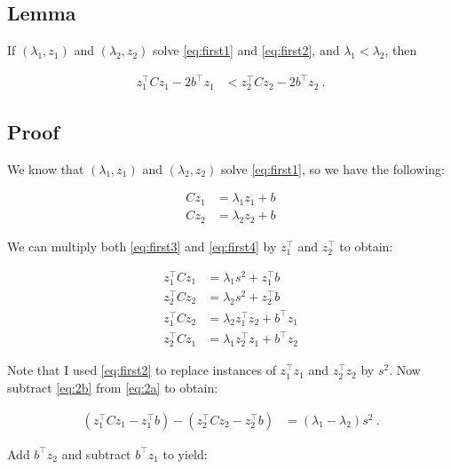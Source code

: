 \documentclass[10pt,letterpaper]{article}
\begin{document}
\subsection*{Lemma}

If $(\lambda_1,z_1)$ and $(\lambda_2,z_2)$ solve \eqref{eq:first1} and \eqref{eq:first2}, and $\lambda_1 < \lambda_2$, then


\begin{align*}
z_1^\top C z_1 - 2b^\top z_1 &< z_2^\top C z_2 - 2b^\top z_2~.
\end{align*}


\subsection*{Proof}
We know that $(\lambda_1,z_1)$ and $(\lambda_2,z_2)$ solve \eqref{eq:first1}, so we have the following:

\begin{subequations}
\begin{align}
\label{eq:first3} Cz_1 &= \lambda_1 z_1 + b \\
\label{eq:first4} Cz_2 &= \lambda_2 z_2 + b
\end{align}
\end{subequations}


We can multiply both \eqref{eq:first3} and \eqref{eq:first4} by $z_1^\top$ and $z_2^\top$ to obtain:


\begin{subequations}
\begin{align}
\label{eq:2a}z_1^\top C z_1 &= \lambda_1 s^2 + z_1^\top b \\
\label{eq:2b}z_2^\top C z_2 &= \lambda_2 s^2 + z_2^\top b \\
\label{eq:2c}z_1^\top C z_2 &= \lambda_2z_1^\top z_2 + b^\top z_1 \\
\label{eq:2d}z_2^\top C z_1 &= \lambda_1z_2^\top z_1 + b^\top z_2 \end{align}
\end{subequations}


Note that I used \eqref{eq:first2} to replace instances of $z_1^\top z_1$ and $z_2^\top z_2$ by $s^2$. Now subtract \eqref{eq:2b} from \eqref{eq:2a} to obtain:


\begin{align*}
(z_1^\top C z_1 - z_1^\top b) - (z_2^\top C z_2 - z_2^\top b) &= (\lambda_1 - \lambda_2)s^2~.
\end{align*}


Add $b^\top z_2$ and subtract $b^\top z_1$ to yield:
\end{document}
